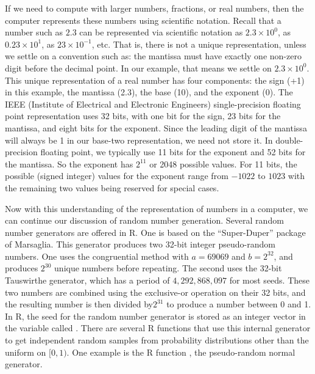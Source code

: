 If we need to compute with larger numbers, fractions, or real numbers,
then the computer represents these numbers using scientific notation.
Recall that a number such as $2.3$ can be represented via scientific
notation as $2.3 \times 10^0$, as $0.23 \times 10^1$, as $23 \times
10^{-1}$, etc.  That is, there is not a unique representation, unless
we settle on a convention such as: the mantissa must have exactly one
non-zero digit before the decimal point.  In our example, that means
we settle on $2.3 \times 10^0$.  This unique representation of a real
number has four components: the sign (+1) in this example, the
mantissa (2.3), the base (10), and the exponent (0).  The IEEE
(Institute of Electrical and Electronic Engineers) single-precision
floating point representation uses 32 bits, with one bit for the sign,
23 bits for the mantissa, and eight bits for the exponent.  Since the
leading digit of the mantissa will always be 1 in our base-two
representation, we need not store it.  In double-precision floating
point, we typically use 11 bits for the exponent and 52 bits for the
mantissa.  So the exponent has $2^{11}$ or 2048 possible values.  For
11 bits, the possible (signed integer) values for the exponent
range from $-1022$ to $1023$ with the remaining two values being
reserved for special cases.


Now with this understanding of the representation of numbers in a
computer, we can continue our discussion of random number
generation. Several random number generators are offered in R.  One is
based on the ``Super-Duper'' package of Marsaglia.  This generator
produces two 32-bit integer pseudo-random numbers.  One uses 
the congruential method with $a = 69069 $ and $ b = 2^{32}$, and produces
$2^{30}$ unique numbers before repeating.  The second uses the 32-bit
Tauswirthe generator, which has a period of $4,292,868,097$ for most
seeds. These two numbers are combined using the exclusive-or operation
on their 32 bits, and the resulting number is then divided by$2^{31}$
to produce a number between 0 and 1.  In R, the seed for the random
number generator is stored as an integer vector in the variable called
.  There are several R functions that use this
internal generator to get independent random samples from probability
distributions other than the uniform on $[0,1)$. One example is the R
function , the pseudo-random normal generator.



